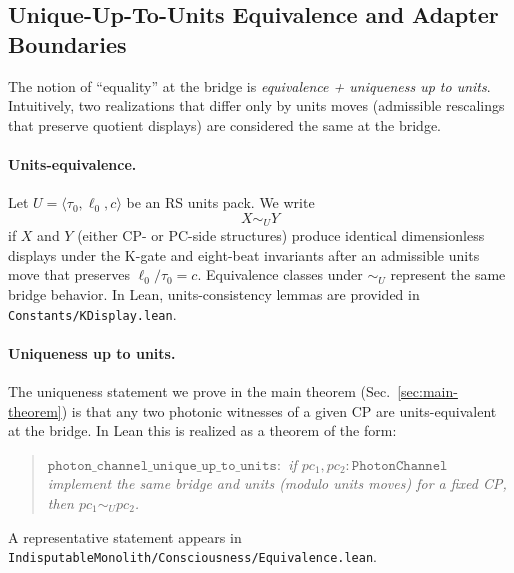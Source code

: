 \documentclass[12pt,a4paper]{article}
\begin{document}
\subsection{Unique-Up-To-Units Equivalence and Adapter Boundaries}
\label{subsec:units-equivalence}
The notion of ``equality'' at the bridge is \emph{equivalence + uniqueness up to units}. Intuitively, two realizations that differ only by units moves (admissible rescalings that preserve quotient displays) are considered the same at the bridge.

\paragraph{Units-equivalence.}
Let \(U=\langle \tau_0,\ell_0,c\rangle\) be an RS units pack. We write
\[
  X \sim_U Y
\]
if \(X\) and \(Y\) (either CP- or PC-side structures) produce identical dimensionless displays under the K-gate and eight-beat invariants after an admissible units move that preserves \(\ell_0/\tau_0=c\). Equivalence classes under \(\sim_U\) represent the same bridge behavior. In Lean, units-consistency lemmas are provided in \texttt{Constants/KDisplay.lean}.

\paragraph{Uniqueness up to units.}
The uniqueness statement we prove in the main theorem (Sec.~\ref{sec:main-theorem}) is that any two photonic witnesses of a given CP are units-equivalent at the bridge. In Lean this is realized as a theorem of the form:
\begin{quote}\itshape
\(\texttt{photon\_channel\_unique\_up\_to\_units} :\) if \(pc_1, pc_2:\texttt{PhotonChannel}\) implement the same bridge and units (modulo units moves) for a fixed CP, then \(pc_1 \sim_U pc_2\).
\end{quote}
A representative statement appears in \texttt{IndisputableMonolith/Consciousness/Equivalence.lean}.
\end{document}
